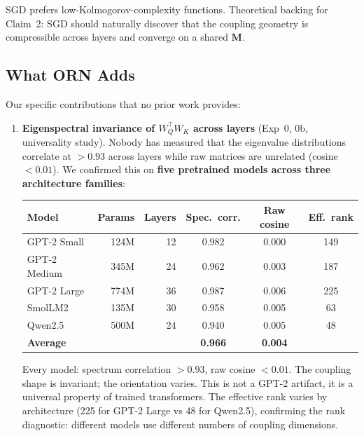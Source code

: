 \documentclass[11pt, a4paper]{article}
\newcommand{\M}{\mathbf{M}}
\theoremstyle{remark}
\begin{document}
\begin{description}[nosep, leftmargin=1.5em]
    \item[Simplicity bias~\cite{louis2025occam}:]
    SGD prefers low-Kolmogorov-complexity functions.
    Theoretical backing for Claim~2: SGD should naturally discover that the coupling geometry is compressible across layers and converge on a shared $\M$.
\end{description}

\subsection{What ORN Adds}

Our specific contributions that no prior work provides:

\begin{enumerate}[nosep]
    \item \textbf{Eigenspectral invariance of $W_Q^\top W_K$ across layers} (Exp~0, 0b, universality study).
    Nobody has measured that the eigenvalue distributions correlate at $>0.93$ across layers while raw matrices are unrelated (cosine $< 0.01$).
    We confirmed this on \textbf{five pretrained models across three architecture families}:

    \begin{center}\small
    \begin{tabular}{@{}lrrccc@{}}
    \toprule
    \textbf{Model} & \textbf{Params} & \textbf{Layers} & \textbf{Spec.\ corr.} & \textbf{Raw cosine} & \textbf{Eff.\ rank} \\
    \midrule
    GPT-2 Small & 124M & 12 & 0.982 & 0.000 & 149 \\
    GPT-2 Medium & 345M & 24 & 0.962 & 0.003 & 187 \\
    GPT-2 Large & 774M & 36 & 0.987 & 0.006 & 225 \\
    SmolLM2 & 135M & 30 & 0.958 & 0.005 & 63 \\
    Qwen2.5 & 500M & 24 & 0.940 & 0.005 & 48 \\
    \midrule
    \textbf{Average} & & & \textbf{0.966} & \textbf{0.004} & \\
    \bottomrule
    \end{tabular}
    \end{center}

    \noindent Every model: spectrum correlation $> 0.93$, raw cosine $< 0.01$.
    The coupling shape is invariant; the orientation varies.
    This is not a GPT-2 artifact, it is a universal property of trained transformers.
    The effective rank varies by architecture (225 for GPT-2 Large vs 48 for Qwen2.5), confirming the rank diagnostic: different models use different numbers of coupling dimensions.


\end{enumerate}
\end{document}
